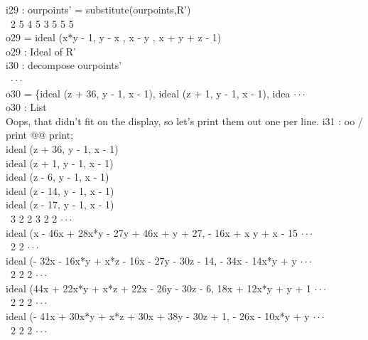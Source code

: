 \beginOutput
i29 : ourpoints' = substitute(ourpoints,R')\\
\emptyLine
\                2       5    4   5    3   5    5    5\\
o29 = ideal (x*y  - 1, y  - x , x  - y , x  + y  + z  - 1)\\
\emptyLine
o29 : Ideal of R'\\
\endOutput
\beginOutput
i30 : decompose ourpoints'\\
\emptyLine
\                                                                       $\cdot\cdot\cdot$\\
o30 = \{ideal (z + 36, y - 1, x - 1), ideal (z + 1, y - 1, x - 1), idea $\cdot\cdot\cdot$\\
\emptyLine
o30 : List\\
\endOutput
Oops, that didn't fit on the display, so let's print them out one per line.
\beginOutput
i31 : oo / print @@ print;\\
ideal (z + 36, y - 1, x - 1)\\
\emptyLine
ideal (z + 1, y - 1, x - 1)\\
\emptyLine
ideal (z - 6, y - 1, x - 1)\\
\emptyLine
ideal (z - 14, y - 1, x - 1)\\
\emptyLine
ideal (z - 17, y - 1, x - 1)\\
\emptyLine
\        3      2              2                      3    2     2      $\cdot\cdot\cdot$\\
ideal (x  - 46x  + 28x*y - 27y  + 46x + y + 27, - 16x  + x y + x  - 15 $\cdot\cdot\cdot$\\
\emptyLine
\            2                                            2             $\cdot\cdot\cdot$\\
ideal (- 32x  - 16x*y + x*z - 16x - 27y - 30z - 14, - 34x  - 14x*y + y $\cdot\cdot\cdot$\\
\emptyLine
\          2                                         2            2     $\cdot\cdot\cdot$\\
ideal (44x  + 22x*y + x*z + 22x - 26y - 30z - 6, 18x  + 12x*y + y  + 1 $\cdot\cdot\cdot$\\
\emptyLine
\            2                                           2            2 $\cdot\cdot\cdot$\\
ideal (- 41x  + 30x*y + x*z + 30x + 38y - 30z + 1, - 26x  - 10x*y + y  $\cdot\cdot\cdot$\\
\emptyLine
\          2                                            2            2  $\cdot\cdot\cdot$\\
